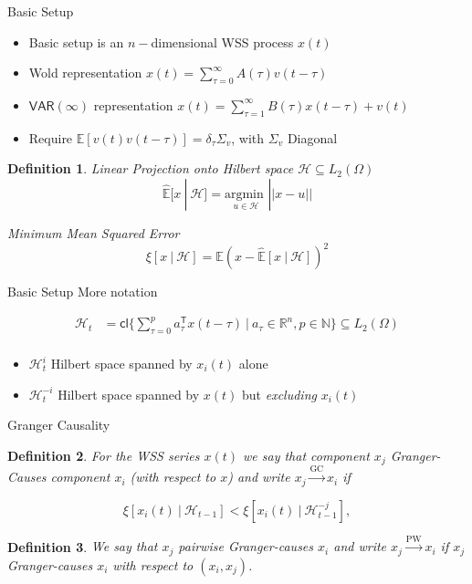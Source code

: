 \documentclass{beamer} %
\newtheorem*{defn}{Definition}
\def\E{\mathbb{E}}  %
\def\gc{\overset{\text{GC}}{\rightarrow}}  %
\def\pwgc{\overset{\text{PW}}{\rightarrow}}  %
\def\VAR{\mathsf{VAR}}  %
\def\H{\mathcal{H}}  %
\def\R{\mathbb{R}}  %
\def\N{\mathbb{N}}  %
\def\T{\mathsf{T}}  %
\def\cl{\mathsf{cl}}  %
\newcommand{\linE}[2]{\hat{\E}[#1\ |\ #2]}  %
\newcommand{\linEerr}[2]{\xi[#1\ |\ #2]}  %
\begin{document}
\begin{frame}{Basic Setup}
  \begin{itemize}
    \item{Basic setup is an $n-$dimensional WSS process $x(t)$}\pause
    \item{Wold representation $x(t) = \sum_{\tau = 0}^\infty A(\tau)v(t - \tau)$}\pause
    \item{$\VAR(\infty)$ representation $x(t) = \sum_{\tau = 1}^\infty B(\tau)x(t - \tau) + v(t)$}\pause
    \item{Require $\E[v(t)v(t - \tau)] = \delta_{\tau}\Sigma_v$, with $\Sigma_v$ Diagonal}\pause
  \end{itemize}

  \begin{defn}
    Linear Projection onto Hilbert space $\H \subseteq L_2(\Omega)$
    \begin{equation*}
      \linE{x}{\H} = \underset{u \in \H}{\text{argmin }} ||x - u||
    \end{equation*}

    Minimum Mean Squared Error
    \begin{equation*}
      \xi[x \ |\ \H] = \E (x - \linE{x}{\H})^2      
    \end{equation*}
  \end{defn}
\end{frame}

\begin{frame}{Basic Setup}
  More notation

  \begin{align*}
    \H_t &= \cl \{\sum_{\tau = 0}^p a_\tau^\T x(t - \tau)\ |\ a_\tau \in \R^n, p \in \N\} \subseteq L_2(\Omega)\\
  \end{align*}\pause

  \begin{itemize}
    \item{$\H_t^{i}$ Hilbert space spanned by $x_i(t)$ alone}
    \item{$\H_t^{-i}$ Hilbert space spanned by $x(t)$ but \textit{excluding} $x_i(t)$}
  \end{itemize}
\end{frame}

\begin{frame}{Granger Causality}
  \begin{defn}
    For the WSS series $x(t)$ we say that component $x_j$
    \textit{Granger-Causes} component $x_i$ (with respect to $x$)
    and write $x_j \gc x_i$ if

    \begin{equation*}
      \linEerr{x_i(t)}{\H_{t - 1}} < \linEerr{x_i(t)}{\H^{-j}_{t - 1}},
    \end{equation*}
  \end{defn}\pause

  \begin{defn}
    We say that $x_j$ pairwise Granger-causes $x_i$ and write
    $x_j \pwgc x_i$ if $x_j$ Granger-causes $x_i$ with respect to
    $(x_i, x_j)$.
  \end{defn}
\end{frame}
\end{document}
